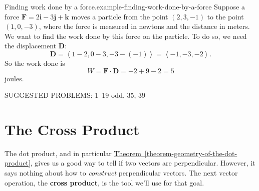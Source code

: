 \documentclass[10pt,]{book}
\newcommand{\terminology}[1]{\textbf{#1}}
\numberwithin{equation}{section}
\newcommand{\vv}[1]{\mathbf{#1}}
\newcommand{\dotprod}[1]{\left\langle #1 \right\rangle}
\begin{document}
\begin{example}{Finding work done by a force.}{example-finding-work-done-by-a-force}%
\hypertarget{p-1161}{}%
Suppose a force \(\vv{F} = 2\vv{i}-3\vv{j}+\vv{k}\) moves a particle from the point \((2,3,-1)\) to the point \((1,0,-3)\), where the force is measured in newtons and the distance in meters. We want to find the work done by this force on the particle. To do so, we need the displacement \(\vv{D}\):%
%
\begin{equation*}
\vv{D} = \dotprod{1-2,0-3,-3-(-1)} = \dotprod{-1,-3,-2}.
\end{equation*}
\hypertarget{p-1162}{}%
So the work done is%
%
\begin{equation*}
W = \vv{F}\cdot\vv{D} = -2+9-2 = 5
\end{equation*}
\hypertarget{p-1163}{}%
joules.%
\end{example}
\hypertarget{p-1164}{}%
SUGGESTED PROBLEMS: 1--19 odd, 35, 39%
%
%
\typeout{************************************************}
\typeout{************************************************}
%
\section[{The Cross Product}]{The Cross Product}\label{section-the-cross-product}
\begin{introduction}{}%
\hypertarget{p-1165}{}%
The dot product, and in particular \hyperref[theorem-geometry-of-the-dot-product]{Theorem~\ref{theorem-geometry-of-the-dot-product}}, gives us a good way to tell if two vectors are perpendicular. However, it says nothing about how to \emph{construct} perpendicular vectors. The next vector operation, the \terminology{cross product}, is the tool we'll use for that goal.%
\end{introduction}%
%
%
\typeout{************************************************}
\typeout{************************************************}
%
\end{document}
